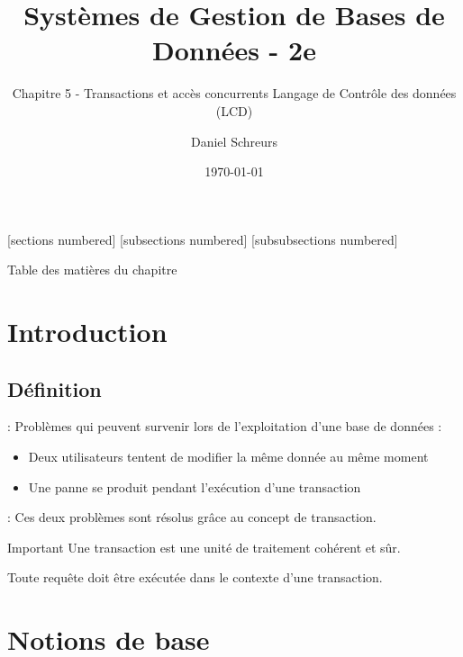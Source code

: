 \documentclass[10pt]{beamer}
\title{Systèmes de Gestion de Bases de Données - 2e}
\subtitle{Chapitre 5 - Transactions et accès concurrents Langage de Contrôle des données (LCD)}
\date{\today}
\author{Daniel Schreurs}
\institute{Haute École de Province de Liège}
\begin{document}
\maketitle

[sections numbered]
[subsections numbered]
[subsubsections numbered]
\begin{frame}[allowframebreaks]{Table des matières du chapitre}
    \tableofcontents[subsectionstyle=show/show/hide,subsubsectionstyle=show/show/hide,]
\end{frame}

\section{Introduction}
\tocss
\subsection{Définition}
\begin{frame}{\secname : \subsecname}
    Problèmes qui peuvent survenir lors de l'exploitation d'une base de données :
    \begin{itemize}
        \item Deux utilisateurs tentent de modifier la même donnée au même moment
        \item Une panne se produit pendant l'exécution d'une transaction
    \end{itemize}
\end{frame}

\begin{frame}{\secname : \subsecname}
    Ces deux problèmes sont résolus grâce au concept de transaction.
    \begin{alertblock}{Important}
        Une transaction est une unité de traitement cohérent et sûr.
    \end{alertblock}
    Toute requête doit être exécutée dans le contexte d'une transaction.
\end{frame}
\section{Notions de base}
\tocss
\end{document}
